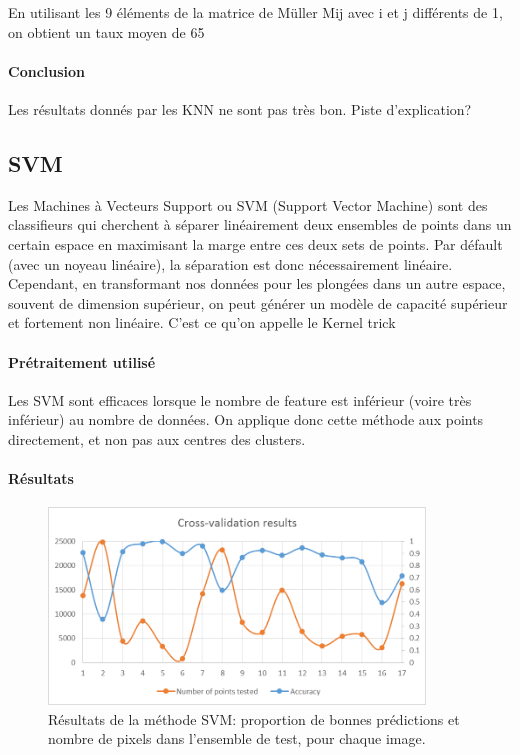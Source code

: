 \documentclass[a4paper,10pt]{report}
\begin{document}
En utilisant les 9 éléments de la matrice de Müller Mij avec i et j différents de 1, on obtient un taux moyen de 65%
\paragraph{Conclusion}
Les résultats donnés par les KNN ne sont pas très bon. Piste d'explication?

\subsection{SVM}
Les Machines à Vecteurs Support ou SVM (Support Vector Machine) sont des classifieurs qui cherchent à séparer linéairement deux ensembles de points dans un certain espace en maximisant la marge entre ces deux sets de points. Par défault (avec un noyeau linéaire), la séparation est donc nécessairement linéaire. Cependant, en transformant nos données pour les plongées dans un autre espace, souvent de dimension supérieur, on peut générer un modèle de capacité supérieur et fortement non linéaire. C'est ce qu'on appelle le Kernel trick

\paragraph{Prétraitement utilisé}
Les SVM sont efficaces lorsque le nombre de feature est inférieur (voire très inférieur) au nombre de données. On applique donc cette méthode aux points directement, et non pas aux centres des clusters.

\paragraph{Résultats}

\begin{figure}[H]
  \centering  
  \caption{Résultats de la méthode SVM: proportion de bonnes prédictions et nombre de pixels dans l'ensemble de test, pour chaque image.}
  \includegraphics[width=10cm]{SVM_CV.png}
\end{figure}
\end{document}
